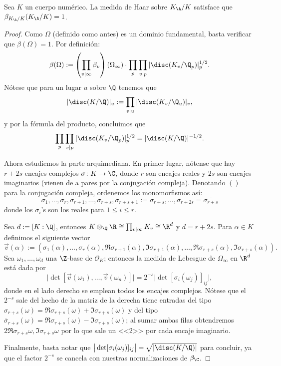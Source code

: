 \documentclass[teoria-numeros.tex]{subfiles}
\begin{document}
\begin{prop}
	Sea $K$ un cuerpo numérico.
	La medida de Haar sobre $K_\A/K$ satisface que $\beta_{K_\A/K}(K_\A/K) = 1$.
\end{prop}
\begin{proof}
	Como $\Omega$ (definido como antes) es un dominio fundamental, basta verificar que $\beta(\Omega) = 1$.
	Por definición:
	$$ \beta(\Omega) := \left(\prod_{v\mid\infty} \beta_v\right)(\Omega_\infty) \cdot \prod_{p} \prod_{v\mid p} |\disc(K_v/\Q_p)|_p^{1/2}. $$
	Nótese que para un lugar $u$ sobre $\Q$ tenemos que
	$$ |\disc(K/\Q)|_u := \prod_{v \mid u} |\disc(K_v/\Q_u)|_v, $$
	y por la fórmula del producto, concluimos que
	$$ \prod_{p} \prod_{v \mid p} |\disc(K_v/\Q_p)|_p^{1/2} = |\disc(K/\Q)|^{-1/2}. $$

	Ahora estudiemos la parte arquimediana.
	En primer lugar, nótense que hay $r + 2s$ encajes complejos $\sigma \colon K \to \C$,
	donde $r$ son encajes reales y $2s$ son encajes imaginarios (vienen de a pares por la conjugación compleja).
	Denotando $\overline{()}$ para la conjugación compleja, ordenemos los monomorfismos así:
	$$ \sigma_1, \dots, \sigma_r, \sigma_{r+1}, \dots, \sigma_{r+s}, \sigma_{r+s+1} := \overline{\sigma_{r+s}}, \dots, \sigma_{r+2s} = \overline{\sigma_{r+s}} $$
	donde los $\sigma_i$'s son los reales para $1 \le i \le r$.

	Sea $d := [K : \Q]$, entonces $K \otimes_\Q \R \cong \prod_{v \mid \infty} K_v \cong \R^d$ y $d = r + 2s$.
	Para $\alpha \in K$ definimos el siguiente vector
	$$ \vec v(\alpha) := ( \sigma_1(\alpha), \dots, \sigma_r(\alpha),
	\Re\sigma_{r+1}(\alpha), \Im\sigma_{r+1}(\alpha), \dots, \Re\sigma_{r+s}(\alpha), \Im\sigma_{r+s}(\alpha)). $$
	Sea $\omega_1, \dots, \omega_d$ una $\Z$-base de $\mathcal{O}_K$; entonces la medida de Lebesgue de $\Omega_\infty$ en $\R^d$ está dada por
	$$ \big| \det[\vec v(\omega_1), \dots, \vec v(\omega_n)] \big| = 2^{-s} \big| \det[\sigma_i(\omega_j)]_{ij} \big|, $$
	donde en el lado derecho se emplean todos los encajes complejos.
	Nótese que el $2^{-s}$ sale del hecho de la matriz de la derecha tiene entradas del tipo $\sigma_{r+s}(\omega) = \Re\sigma_{r+s}(\omega) +
	\Im\sigma_{r+s}(\omega)$ y del tipo $\overline{\sigma}_{r+s}(\omega) = \Re\sigma_{r+s}(\omega) - \Im\sigma_{r+s}(\omega)$;
	al sumar ambas filas obtendremos $2\Re\sigma_{r+s}\omega, \Im\sigma_{r+s}\omega$ por lo que sale un <<2>> por cada encaje imaginario.

	Finalmente, basta notar que $\big| \det[\sigma_i(\omega_j)]_{ij} \big| = \sqrt{| \disc(K/\Q) |}$ para concluir, ya que el factor $2^{-s}$
	se cancela con nuestras normalizaciones de $\beta_\C$.
\end{proof}
\end{document}
